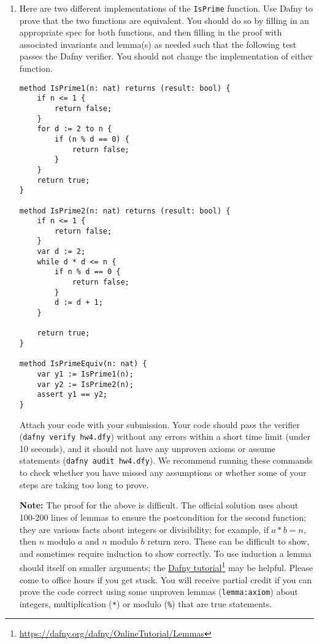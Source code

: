 \documentclass{article}
\newcommand{\visiblehref}[2]{\href{#1}{#2}\footnote{\url{#1}}}
\begin{document}
\begin{enumerate}
\item
Here are two different implementations of the \texttt{IsPrime} function.
Use Dafny to prove that the two functions are equivalent.
You should do so by filling in an appropriate spec for both functions,
and then filling in the proof with associated invariants and lemma(s) as needed
such that the following test passes the Dafny verifier.
You should not change the implementation of either function.

\begin{verbatim}
method IsPrime1(n: nat) returns (result: bool) {
    if n <= 1 {
        return false;
    }
    for d := 2 to n {
        if (n % d == 0) {
            return false;
        }
    }
    return true;
}

method IsPrime2(n: nat) returns (result: bool) {
    if n <= 1 {
        return false;
    }
    var d := 2;
    while d * d <= n {
        if n % d == 0 {
            return false;
        }
        d := d + 1;
    }

    return true;
}

method IsPrimeEquiv(n: nat) {
    var y1 := IsPrime1(n);
    var y2 := IsPrime2(n);
    assert y1 == y2;
}
\end{verbatim}

Attach your code with your submission.
Your code should pass the verifier (\texttt{dafny verify hw4.dfy}) without any errors
within a short time limit (under 10 seconds),
and it should not have any unproven axioms or assume statements (\texttt{dafny audit hw4.dfy}).
We recommend running these commands to check whether you have missed any assumptions or whether some of your steps are taking too long to prove.

\textbf{Note:}
The proof for the above is difficult.
The official solution uses about 100-200 lines of lemmas
to ensure the postcondition for the second function;
they are various facts about integers or divisibility;
for example, if $a * b = n$, then $n$ modulo $a$ and $n$ modulo $b$ return zero.
These can be difficult to show, and sometimes require induction to show correctly.
To use induction a lemma should itself on smaller arguments; the \visiblehref{https://dafny.org/dafny/OnlineTutorial/Lemmas}{Dafny tutorial} may be helpful.
Please come to office hours if you get stuck.
You will receive partial credit if you can prove the code correct using some unproven lemmas (\texttt{lemma{:axiom}}) about integers, multiplication (\texttt{*}) or modulo (\texttt{\%}) that are true statements.

\end{enumerate}
\end{document}
